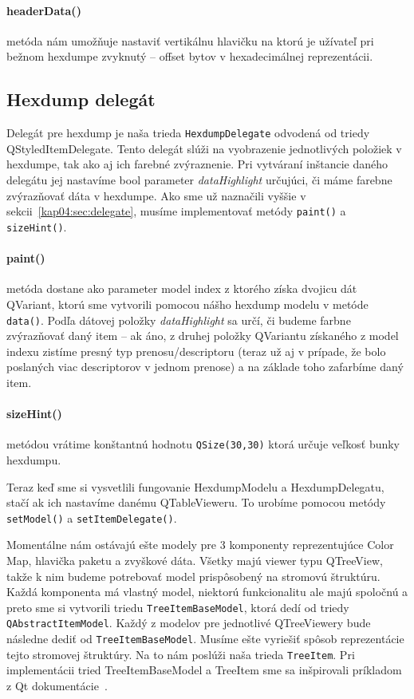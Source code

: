 \paragraph{headerData()} metóda nám umožňuje nastaviť vertikálnu hlavičku na ktorú je užívateľ pri bežnom hexdumpe zvyknutý -- offset bytov v hexadecimálnej reprezentácii.


\subsection{Hexdump delegát}
Delegát pre hexdump je naša trieda \texttt{HexdumpDelegate} odvodená od triedy QStyledItemDelegate. Tento delegát slúži na vyobrazenie jednotlivých položiek v hexdumpe, tak ako aj ich farebné zvýraznenie. Pri vytváraní inštancie daného delegátu jej nastavíme bool parameter \textit{dataHighlight} určujúci, či máme farebne zvýrazňovať dáta v hexdumpe. Ako sme už naznačili vyššie v sekcii~\ref{kap04:sec:delegate}, musíme implementovať metódy \texttt{paint()} a \texttt{sizeHint()}.

\paragraph{paint()} metóda dostane ako parameter model index z ktorého získa dvojicu dát QVariant, ktorú sme vytvorili pomocou nášho hexdump modelu v metóde \texttt{data()}. Podľa dátovej položky \textit{dataHighlight} sa určí, či budeme farbne zvýrazňovať daný item -- ak áno, z druhej položky QVariantu získaného z model indexu zistíme presný typ prenosu/descriptoru (teraz už aj v prípade, že bolo poslaných viac descriptorov v jednom prenose) a na základe toho zafarbíme daný item.

\paragraph{sizeHint()} metódou vrátime konštantnú hodnotu \texttt{QSize(30,30)} ktorá určuje veľkosť bunky hexdumpu.


Teraz keď sme si vysvetlili fungovanie HexdumpModelu a HexdumpDelegatu, stačí ak ich nastavíme danému QTableVieweru. To urobíme pomocou metódy \texttt{setModel()} a \texttt{setItemDelegate()}.

Momentálne nám ostávajú ešte modely pre 3 komponenty reprezentujúce Color Map, hlavička paketu a zvyškové dáta. Všetky majú viewer typu QTreeView, takže k nim budeme potrebovať model prispôsobený na stromovú štruktúru. Každá komponenta má vlastný model, niektorú funkcionalitu ale majú spoločnú a preto sme si vytvorili triedu \texttt{TreeItemBaseModel}, ktorá dedí od triedy \texttt{QAbstractItemModel}. Každý z modelov pre jednotlivé QTreeViewery bude následne dediť od \texttt{TreeItemBaseModel}. Musíme ešte vyriešiť spôsob reprezentácie tejto stromovej štruktúry. Na to nám poslúži naša trieda \texttt{TreeItem}. Pri implementácii tried TreeItemBaseModel a TreeItem sme sa inšpirovali príkladom z Qt dokumentácie~\cite{qtreemodelexample}.


